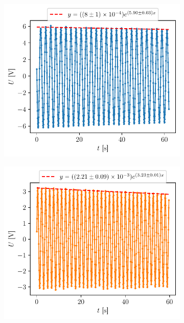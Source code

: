 \begin{figure}[H]
    \centering
    \begin{subfigure}{0.45\linewidth}
        \centering
        \includegraphics[width=\linewidth]{figures/laiton1.pdf}
        \caption{}
        \label{fig:dynamique_laiton}
    \end{subfigure}
    \begin{subfigure}{0.45\linewidth}
        \centering
        \includegraphics[width=\linewidth]{figures/acier1.pdf}

\end{subfigure}
\end{figure}
